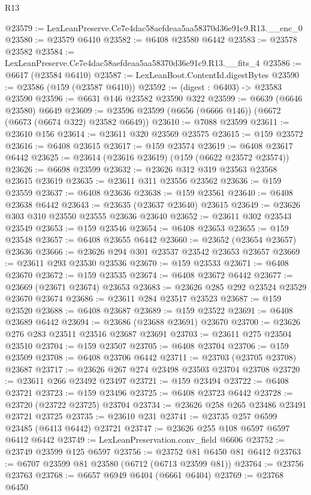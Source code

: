 \begin{lexlean}{R13}
\begin{coremodule}
@23579 := LexLeanPreserve.Ce7e4dac58aefdeaa5aa58370d36e91c9.R13.__enc_0
@23580 := @23579 @6410
@23582 := @6408 @23580 @6442
@23583 := @23578 @23582
@23584 := LexLeanPreserve.Ce7e4dac58aefdeaa5aa58370d36e91c9.R13.__fits_4
@23586 := @6617 (@23584 @6410)
@23587 := LexLeanBoot.ContentId.digestBytes
@23590 := @23586 (@159 (@23587 @6410))
@23592 := (digest : @6403) -> @23583 @23590
@23596 := @6631 @146 @23582 @23590 @322
@23599 := @6639 (@6646 @23580) @6649
@23609 := @23596 @23599 (@6656 (@6666 @146)) (@6672 (@6673 (@6674 @322) @23582 @6649))
@23610 := @7088 @23599
@23611 := @23610 @156
@23614 := @23611 @320 @23569 @23575
@23615 := @159 @23572
@23616 := @6408 @23615
@23617 := @159 @23574
@23619 := @6408 @23617 @6442
@23625 := @23614 (@23616 @23619) (@159 (@6622 @23572 @23574))
@23626 := @6698 @23599
@23632 := @23626 @312 @319 @23563 @23568 @23615 @23619
@23635 := @23611 @311 @23556 @23562
@23636 := @159 @23559
@23637 := @6408 @23636
@23638 := @159 @23561
@23640 := @6408 @23638 @6442
@23643 := @23635 (@23637 @23640) @23615
@23649 := @23626 @303 @310 @23550 @23555 @23636 @23640
@23652 := @23611 @302 @23543 @23549
@23653 := @159 @23546
@23654 := @6408 @23653
@23655 := @159 @23548
@23657 := @6408 @23655 @6442
@23660 := @23652 (@23654 @23657) @23636
@23666 := @23626 @294 @301 @23537 @23542 @23653 @23657
@23669 := @23611 @293 @23530 @23536
@23670 := @159 @23533
@23671 := @6408 @23670
@23672 := @159 @23535
@23674 := @6408 @23672 @6442
@23677 := @23669 (@23671 @23674) @23653
@23683 := @23626 @285 @292 @23524 @23529 @23670 @23674
@23686 := @23611 @284 @23517 @23523
@23687 := @159 @23520
@23688 := @6408 @23687
@23689 := @159 @23522
@23691 := @6408 @23689 @6442
@23694 := @23686 (@23688 @23691) @23670
@23700 := @23626 @276 @283 @23511 @23516 @23687 @23691
@23703 := @23611 @275 @23504 @23510
@23704 := @159 @23507
@23705 := @6408 @23704
@23706 := @159 @23509
@23708 := @6408 @23706 @6442
@23711 := @23703 (@23705 @23708) @23687
@23717 := @23626 @267 @274 @23498 @23503 @23704 @23708
@23720 := @23611 @266 @23492 @23497
@23721 := @159 @23494
@23722 := @6408 @23721
@23723 := @159 @23496
@23725 := @6408 @23723 @6442
@23728 := @23720 (@23722 @23725) @23704
@23734 := @23626 @258 @265 @23486 @23491 @23721 @23725
@23735 := @23610 @231
@23741 := @23735 @257 @6599 @23485 (@6413 @6442) @23721
@23747 := @23626 @255 @108 @6597 @6597 @6412 @6442
@23749 := LexLeanPreservation.conv_field @6606
@23752 := @23749 @23599 @125 @6597
@23756 := @23752 @81 @6450 @81 @6412
@23763 := @6707 @23599 @81 @23580 (@6712 (@6713 @23599 @81))
@23764 := @23756 @23763
@23768 := @6657 @6949 @6404 (@6661 @6404)
@23769 := @23768 @6450

\end{coremodule}
\end{lexlean}
